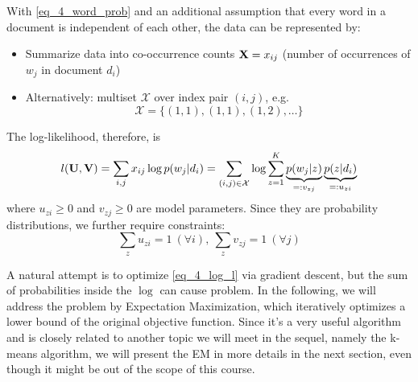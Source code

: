 \documentclass[../book-template.tex]{subfiles}
\begin{document}
\par With \eqref{eq_4_word_prob} and an additional assumption that every word in a document is independent of each other, the data can be represented by:
\begin{itemize}
	\item Summarize data into co-occurrence counts ${\bf X}=x_{ij}$ (number of occurrences of $w_j$ in document $d_i$)
	\item Alternatively: multiset $\mathcal{X}$ over index pair $(i,j)$, e.g. 
	$$\mathcal{X} = \{(1,1), (1,1), (1, 2),\dots\}$$
\end{itemize} 
The log-likelihood, therefore, is
\begin{equation}\label{eq_4_log_l}
	l({\bf U},{\bf V})=\sum_{i,j}x_{ij}\log p(w_j|d_i)=\sum_{(i,j)\in \mathcal{X}}\log \sum_{z=1}^{K} \underbrace{p(w_j|z)}_{=:v_{zj}}\underbrace{p(z|d_i)}_{=:u_{zi}}
\end{equation}
where $u_{zi}\geq 0$ and $v_{zj}\geq 0$ are model parameters. Since they are probability distributions, we further require constraints:
\begin{equation*}
	\sum_z u_{zi}=1\ (\forall i),\ \sum_z v_{zj}=1\ (\forall j)
\end{equation*}
\par A natural attempt is to optimize \eqref{eq_4_log_l} via gradient descent, but the sum of probabilities inside the $\log$ can cause problem. In the following, we will address the problem by Expectation Maximization, which iteratively optimizes a lower bound of the original objective function. Since it's a very useful algorithm and is closely related to another topic we will meet in the sequel, namely the k-means algorithm, we will present the EM in more details in the next section, even though it might be out of the scope of this course.
\end{document}
